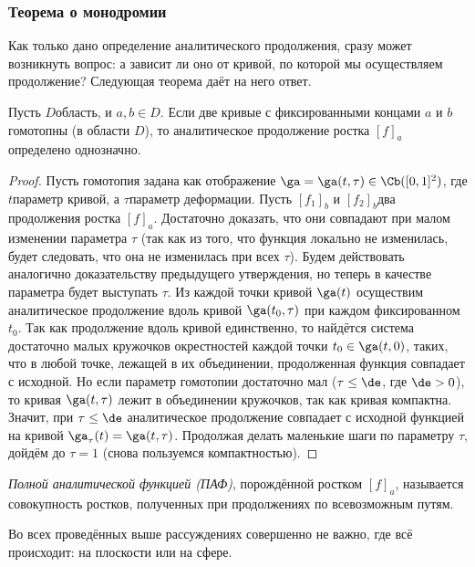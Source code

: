 \documentclass[a4paper]{article}
\begin{document}
\subsubsection{Теорема о монодромии}

Как только дано определение аналитического продолжения, сразу может возникнуть вопрос: а зависит ли оно от кривой,
по которой мы осуществляем продолжение? Следующая теорема даёт на него ответ.

\begin{theorem}[о монодромии]
Пусть $D$\т область, и $a,b\in D$. Если две кривые с фиксированными концами $a$ и $b$ гомотопны (в области $D$),
то аналитическое продолжение ростка $[f]_a$ определено однозначно.
\end{theorem}
\begin{proof}
Пусть гомотопия задана как отображение $\ga=\ga(t,\tau) \in \Cb([0,1]^2)$, где $t$\т параметр кривой, а $\tau$\т параметр
деформации. Пусть $[f_1]_b$ и $[f_2]_b$\т два продолжения ростка $[f]_a$. Достаточно доказать, что они совпадают при
малом изменении параметра $\tau$ (так как из того, что функция локально не изменилась, будет следовать, что она не изменилась
при всех $\tau$). Будем действовать аналогично доказательству предыдущего утверждения, но теперь в качестве
параметра будет выступать $\tau$. Из каждой точки кривой $\ga(t)$ осуществим аналитическое продолжение вдоль кривой $\ga(t_0,\tau)$
при каждом фиксированном $t_0$. Так как продолжение вдоль кривой единственно, то найдётся система достаточно малых кружочков\т
окрестностей каждой точки $t_0\in\ga(t,0)$, таких, что в любой точке, лежащей в их объединении, продолженная функция совпадает
с исходной. Но если параметр гомотопии достаточно мал ($\tau \le \de$, где $\de>0$), то кривая $\ga(t,\tau)$ лежит в объединении
кружочков, так как кривая компактна. Значит, при $\tau\le\de$ аналитическое продолжение совпадает с исходной функцией
на кривой $\ga_\tau(t)= \ga(t,\tau)$. Продолжая делать маленькие шаги по параметру $\tau$, дойдём до $\tau=1$
(снова пользуемся компактностью).
\end{proof}

\begin{df}
\emph{Полной аналитической функцией (ПАФ)}, порождённой ростком  $[f]_a$, называется
совокупность ростков, полученных при продолжениях по всевозможным путям.
\end{df}

\begin{note}
Во всех проведённых выше рассуждениях совершенно не важно, где всё происходит: на плоскости или на сфере.
\end{note}
\end{document}
